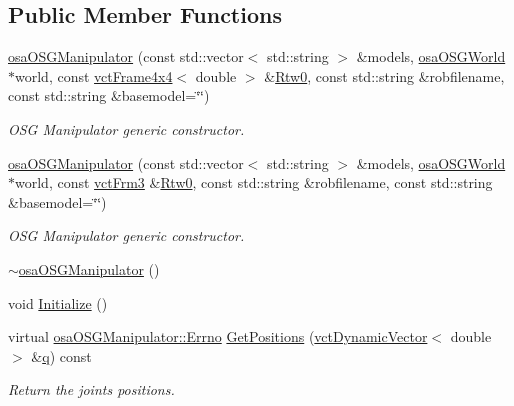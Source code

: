 \subsection*{Public Member Functions}
\begin{DoxyCompactItemize}
\item 
\hyperlink{classosa_o_s_g_manipulator_ac18f717541d9cc52b7c537c960b3a036}{osa\+O\+S\+G\+Manipulator} (const std\+::vector$<$ std\+::string $>$ \&models, \hyperlink{classosa_o_s_g_world}{osa\+O\+S\+G\+World} $\ast$world, const \hyperlink{classvct_frame4x4}{vct\+Frame4x4}$<$ double $>$ \&\hyperlink{classrob_manipulator_ab48d9d9a166bf252698bc35788ca6ad6}{Rtw0}, const std\+::string \&robfilename, const std\+::string \&basemodel=\char`\"{}\char`\"{})
\begin{DoxyCompactList}\small\item\em O\+S\+G Manipulator generic constructor. \end{DoxyCompactList}\item 
\hyperlink{classosa_o_s_g_manipulator_a99b45c43d0bfb6b703a81badb53295ab}{osa\+O\+S\+G\+Manipulator} (const std\+::vector$<$ std\+::string $>$ \&models, \hyperlink{classosa_o_s_g_world}{osa\+O\+S\+G\+World} $\ast$world, const \hyperlink{vct_transformation_types_8h_a81feda0a02c2d1bc26e5553f409fed20}{vct\+Frm3} \&\hyperlink{classrob_manipulator_ab48d9d9a166bf252698bc35788ca6ad6}{Rtw0}, const std\+::string \&robfilename, const std\+::string \&basemodel=\char`\"{}\char`\"{})
\begin{DoxyCompactList}\small\item\em O\+S\+G Manipulator generic constructor. \end{DoxyCompactList}\item 
\hyperlink{classosa_o_s_g_manipulator_ad00b00abff7586792564e7f8c7290cc0}{$\sim$osa\+O\+S\+G\+Manipulator} ()
\item 
void \hyperlink{classosa_o_s_g_manipulator_a6c0df23ade21ee3e76f43bd060fb40dc}{Initialize} ()
\item 
virtual \hyperlink{classrob_manipulator_a7bbb51cdb81c9c681075a9274ca0cdc0}{osa\+O\+S\+G\+Manipulator\+::\+Errno} \hyperlink{classosa_o_s_g_manipulator_a7b3b2cba59afcbde372ebca786093de9}{Get\+Positions} (\hyperlink{classvct_dynamic_vector}{vct\+Dynamic\+Vector}$<$ double $>$ \&\hyperlink{classosa_o_s_g_manipulator_a834ce7263dace4d925133753522abaa3}{q}) const 
\begin{DoxyCompactList}\small\item\em Return the joints positions. \end{DoxyCompactList}\item 

\end{DoxyCompactItemize}
